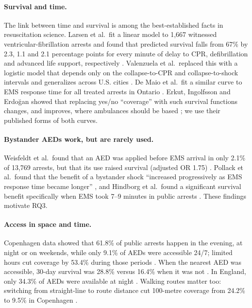 \documentclass[11pt]{article}
\begin{document}
\paragraph{Survival and time.} The link between time and survival is among the best-established facts in resuscitation science. Larsen et al.\ fit a linear model to 1{,}667 witnessed ventricular-fibrillation arrests and found that predicted survival falls from 67\% by 2.3, 1.1 and 2.1 percentage points for every minute of delay to CPR, defibrillation and advanced life support, respectively \cite{larsen1993}. Valenzuela et al.\ replaced this with a logistic model that depends only on the collapse-to-CPR and collapse-to-shock intervals and generalizes across U.S. cities \cite{valenzuela1997}. De Maio et al.\ fit a similar curve to EMS response time for all treated arrests in Ontario \cite{demaio2003}. Erkut, Ingolfsson and Erdo\u{g}an showed that replacing yes/no ``coverage'' with such survival functions changes, and improves, where ambulances should be based \cite{erkut2008}; we use their published forms of both curves.

\paragraph{Bystander AEDs work, but are rarely used.} Weisfeldt et al.\ found that an AED was applied before EMS arrival in only 2.1\% of 13{,}769 arrests, but that its use raised survival (adjusted OR 1.75) \cite{weisfeldt2010}. Pollack et al.\ found that the benefit of a bystander shock ``increased progressively as EMS response time became longer'' \cite{pollack2018}, and Hindborg et al.\ found a significant survival benefit specifically when EMS took 7--9 minutes in public arrests \cite{hindborg2025}. These findings motivate RQ3.

\paragraph{Access in space and time.} Copenhagen data showed that 61.8\% of public arrests happen in the evening, at night or on weekends, while only 9.1\% of AEDs were accessible 24/7; limited hours cut coverage by 53.4\% during those periods \cite{hansen2013}. When the nearest AED was accessible, 30-day survival was 28.8\% versus 16.4\% when it was not \cite{karlsson2019}. In England, only 34.3\% of AEDs were available at night \cite{deakin2018}. Walking routes matter too: switching from straight-line to route distance cut 100-metre coverage from 24.2\% to 9.5\% in Copenhagen \cite{karlsson2021}.
\end{document}
